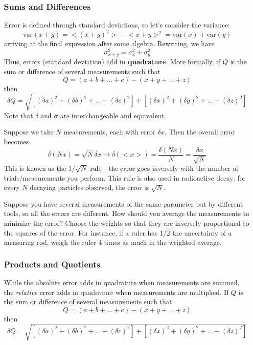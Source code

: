 \documentclass[../PhysicsFormulae.tex]{subfiles}
\begin{document}
\subsubsection{Sums and Differences}
Error is defined through standard deviations, so let's consider the variance:
\[ \mathrm{var}(x + y) = \mathrm{<}(x + y)^2 \mathrm{>} - \mathrm{<}x + y\mathrm{>}^2 = \mathrm{var}(x) + \mathrm{var}(y) \]
arriving at the final expression after some algebra. Rewriting, we have 
\[ \sigma_{x+y}^2 = \sigma_x^2 + \sigma_y^2 \]
Thus, errors (standard deviation) add in \textbf{quadrature}. More formally, if $Q$ is the sum or difference of several measurements such that \[Q = \left(a+b+...+c\right) - \left(x+y+...+z\right)\]
then 
\[\delta Q = \sqrt{[\left(\delta a\right)^2 + \left(\delta b\right)^2 +...+\left(\delta c\right)^2] + [\left(\delta x\right)^2 + \left(\delta y\right)^2 +...+ \left(\delta z\right)^2]}\]
Note that $\delta$ and $\sigma$ are interchangeable and equivalent. \bigskip

Suppose we take $N$ measurements, each with error $\delta x$. Then the overall error becomes 
\[ \delta (Nx) = \sqrt{N} \delta x \rightarrow \delta(\mathrm{<}x\mathrm{>}) = \frac{\delta (Nx)}{N} = \frac{\delta x}{\sqrt{N}} \]
This is known as the $1/\sqrt{N}$ rule---the error goes inversely with the number of trials/measurements you perform. This rule is also used in radioactive decay; for every $N$ decaying particles observed, the error is $\sqrt{N}$. 

\bigskip
Suppose you have several measurements of the same parameter but by different tools, so all the errors are different. How should you average the measurements to minimize the error? Choose the weights so that they are inversely proportional to the squares of the error. For instance, if a ruler has 1/2 the uncertainty of a measuring rod, weigh the ruler 4 times as much in the weighted average. 

\subsubsection{Products and Quotients}
While the absolute error adds in quadrature when measurements are summed, the \textit{relative} error adds in quadrature when measurements are multiplied. If $Q$ is the sum or difference of several measurements such that \[Q = \left(a+b+...+c\right) - \left(x+y+...+z\right)\]
then 
\[\delta Q = \sqrt{[\left(\delta a\right)^2 + \left(\delta b\right)^2 +...+\left(\delta c\right)^2] + [\left(\delta x\right)^2 + \left(\delta y\right)^2 +...+ \left(\delta z\right)^2]}\]
\end{document}

